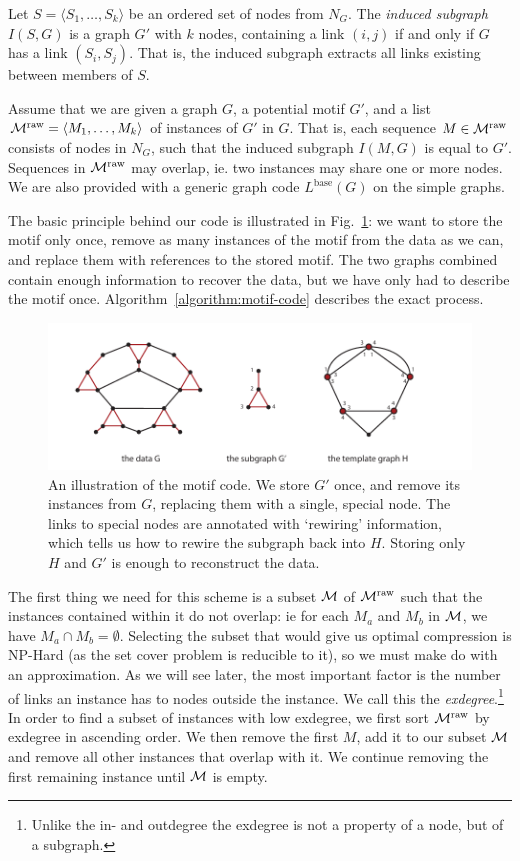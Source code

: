 Let $S = \langle S_1, \ldots, S_k \rangle$ be an ordered set of nodes from $N_G$. The \emph{induced subgraph} $I(S, G)$ is a graph $G'$ with $k$ nodes, containing a link  $(i, j)$ if and only if $G$ has a link $(S_i, S_j)$. That is, the induced subgraph extracts all links existing between members of $S$. 

Assume that we are given a graph $G$, a potential motif $G'$, and a list ${\cal M}^\text{raw} = \langle M_1, \ldots, M_k\rangle$ of instances of $G'$ in $G$. That is, each sequence $M\in {\cal M}^\text{raw}$ consists  of nodes in $N_G$, such that the induced subgraph $I(M, G)$ is equal to $G'$. Sequences in ${\cal M}^\text{raw}$ may overlap, ie. two instances may share one or more nodes. We are also provided with a generic graph code $L^\text{base}(G)$ on the simple graphs. 

The basic principle behind our code is illustrated in Fig.~\ref{figure:motif-code}: we want to store the motif only once, remove as many instances of the motif from the data as we can, and replace them with references to the stored motif. The two graphs combined contain enough information to recover the data, but we have only had to describe the motif once. Algorithm~\ref{algorithm:motif-code} describes the exact process. 

\begin{figure}[htb]
  \includegraphics[width=\textwidth]{./images/illustration.pdf}
  \caption{An illustration of the motif code. We store $G'$ once, and remove its instances from $G$, replacing them with a single, special node. The links to special nodes are annotated with `rewiring' information, which tells us how to rewire the subgraph back into $H$. Storing only $H$ and $G'$ is enough to reconstruct the data.}
   \label{figure:motif-code}
\end{figure}  

The first thing we need for this scheme is a subset $\cal M$ of ${\cal M}^\text{raw}$ such that the instances contained within it do not overlap: ie for each $M_a$ and $M_b$ in $\cal M$, we have $M_a \cap M_b = \emptyset$. Selecting the subset that would give us optimal compression is NP-Hard (as the set cover problem is reducible to it), so we must make do with an approximation. As we will see later, the most important factor is the number of links an instance has to nodes outside the instance. We call this the \emph{exdegree}.\footnote{Unlike the in- and outdegree the exdegree is not a property of a node, but of a subgraph.} In order to find a subset of instances with low exdegree, we first sort ${\cal M}^\text{raw}$ by exdegree in ascending order. We then remove the first $M$, add it to our subset $\cal M$ and remove all other instances that overlap with it. We continue removing the first remaining instance until $\cal M$ is empty.

